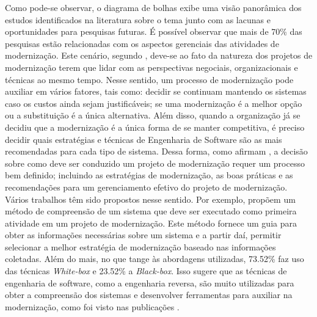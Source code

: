 Como pode-se observar, o diagrama de bolhas exibe uma visão panorâmica dos estudos identificados 
na literatura sobre o tema junto com as lacunas e oportunidades para pesquisas futuras. É possível 
observar que mais de 70\% das pesquisas estão relacionadas com os aspectos gerenciais das atividades de modernização. 
Este cenário, segundo \cite{S13_ransom1998method}, deve-se ao fato da natureza dos projetos de modernização terem que lidar 
com as perspectivas negociais, organizacionais e técnicas ao mesmo tempo. Nesse sentido, um processo de modernização 
pode auxiliar em vários fatores, tais como: decidir se continuam mantendo os sistemas caso os custos ainda sejam justificáveis; 
se uma modernização é a melhor opção ou a substituição é a única alternativa. Além disso, quando a organização já se decidiu 
que a modernização é a única forma de se manter competitiva, é preciso decidir quais estratégias e técnicas de Engenharia de Software são as mais recomendadas 
para cada tipo de sistema. Dessa forma, como afirmam \cite{S05_Lewis:2005, S13_ransom1998method}, a decis\~{a}o 
sobre como deve ser conduzido um projeto de moderniza\c c\~{a}o requer um processo bem definido; incluindo as estratégias de modernização, 
as boas práticas e as recomendações para um gerenciamento efetivo do projeto de modernização. Vários trabalhos têm sido propostos nesse sentido. 
Por exemplo, \cite{S13_ransom1998method} propõem um método de compreensão de um sistema que deve ser executado como primeira atividade em um 
projeto de modernização. Este método fornece um guia para obter as informações necessárias sobre um sistema e a partir daí, permitir selecionar a 
melhor estratégia de modernização baseado nas informações coletadas. Além do mais, no que tange às abordagens utilizadas, 73.52\% faz uso das 
técnicas \textit{White-box} e 23.52\% a \textit{Black-box}. Isso sugere que as técnicas de engenharia de software, como a engenharia reversa, 
são muito utilizadas para obter a compreensão dos sistemas e desenvolver ferramentas para auxiliar na modernização, como foi visto nas publicações
\cite{S29_Chung:2007, S16_fleurey2007model:2007, S13_ransom1998method, S24_visaggio2000value:2000}.


